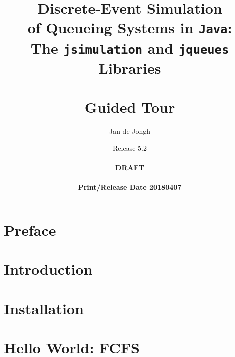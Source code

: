 \documentclass[12pt]{book}
\title{Discrete-Event Simulation\\
       of Queueing Systems in \texttt{Java}:\\
       The \texttt{jsimulation}
       and
       \texttt{jqueues}
       Libraries\\
       \mbox{ } \\
       Guided Tour}
\author{Jan de Jongh}
\date{Release 5.2\\
	  \mbox{ } \\
	  {\bf DRAFT}\\
	  \mbox{ }
	  \\{\bf Print/Release Date 20180407}}
\begin{document}
\maketitle


\chapter*{Preface}
\label{chap:preface}


\chapter{Introduction}
\label{chap:intro}


\chapter{Installation}
\label{chap:install}


\chapter{Hello World: FCFS}
\label{chap:hello-world}


%

%

%
\end{document}
